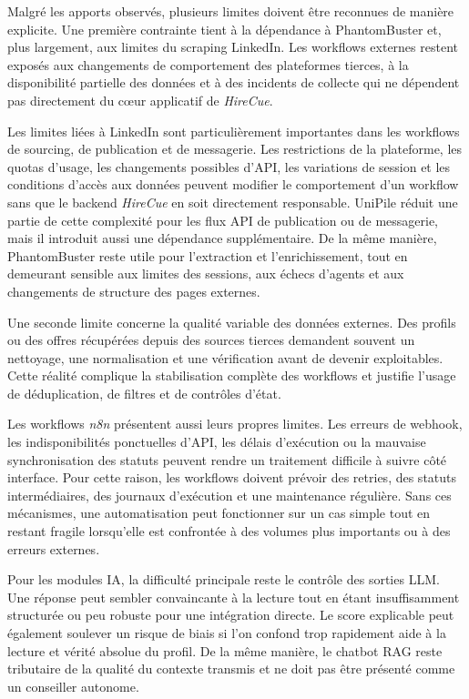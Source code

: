 Malgré les apports observés, plusieurs limites doivent être reconnues de manière explicite. Une première contrainte tient à la dépendance à PhantomBuster et, plus largement, aux limites du scraping LinkedIn. Les workflows externes restent exposés aux changements de comportement des plateformes tierces, à la disponibilité partielle des données et à des incidents de collecte qui ne dépendent pas directement du cœur applicatif de \textit{HireCue}.

Les limites liées à LinkedIn sont particulièrement importantes dans les workflows de sourcing, de publication et de messagerie. Les restrictions de la plateforme, les quotas d'usage, les changements possibles d'API, les variations de session et les conditions d'accès aux données peuvent modifier le comportement d'un workflow sans que le backend \textit{HireCue} en soit directement responsable. UniPile réduit une partie de cette complexité pour les flux API de publication ou de messagerie, mais il introduit aussi une dépendance supplémentaire. De la même manière, PhantomBuster reste utile pour l'extraction et l'enrichissement, tout en demeurant sensible aux limites des sessions, aux échecs d'agents et aux changements de structure des pages externes.

Une seconde limite concerne la qualité variable des données externes. Des profils ou des offres récupérées depuis des sources tierces demandent souvent un nettoyage, une normalisation et une vérification avant de devenir exploitables. Cette réalité complique la stabilisation complète des workflows et justifie l'usage de déduplication, de filtres et de contrôles d'état.

Les workflows \textit{n8n} présentent aussi leurs propres limites. Les erreurs de webhook, les indisponibilités ponctuelles d'API, les délais d'exécution ou la mauvaise synchronisation des statuts peuvent rendre un traitement difficile à suivre côté interface. Pour cette raison, les workflows doivent prévoir des retries, des statuts intermédiaires, des journaux d'exécution et une maintenance régulière. Sans ces mécanismes, une automatisation peut fonctionner sur un cas simple tout en restant fragile lorsqu'elle est confrontée à des volumes plus importants ou à des erreurs externes.

Pour les modules IA, la difficulté principale reste le contrôle des sorties LLM. Une réponse peut sembler convaincante à la lecture tout en étant insuffisamment structurée ou peu robuste pour une intégration directe. Le score explicable peut également soulever un risque de biais si l'on confond trop rapidement aide à la lecture et vérité absolue du profil. De la même manière, le chatbot RAG reste tributaire de la qualité du contexte transmis et ne doit pas être présenté comme un conseiller autonome.

